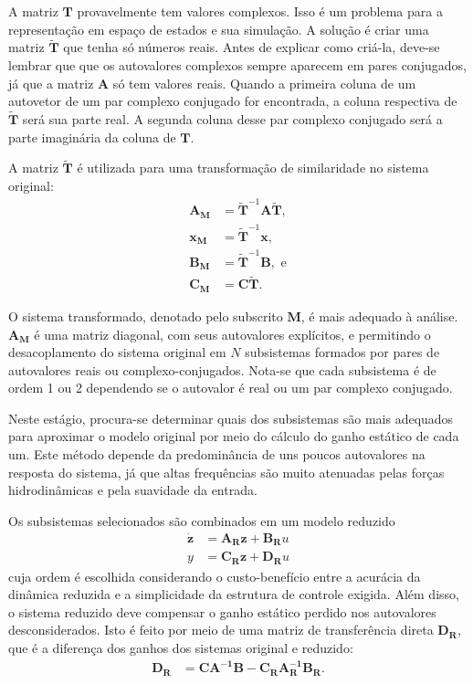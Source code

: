  A matriz $\mathbf{T}$ provavelmente tem valores complexos. Isso é um problema para a representação em espaço de estados e sua simulação. A solução é criar uma matriz $\mathbf{\tilde{T}}$ que tenha só números reais. Antes de explicar como criá-la, deve-se lembrar que que os autovalores complexos sempre aparecem em pares conjugados, já que a matriz $\mathbf{A}$ só tem valores reais. Quando a primeira coluna de um autovetor de um par complexo conjugado for encontrada, a coluna respectiva de $\mathbf{\tilde{T}}$ será sua parte real. A segunda coluna desse par complexo conjugado será a parte imaginária da coluna de $\mathbf{T}$.


 A matriz $\mathbf{\tilde{T}}$ é utilizada para uma transformação de similaridade no sistema original: \begin{align}
	\mathbf{A_M} &= \mathbf{\tilde{T}}^{-1}\mathbf{A}\mathbf{\tilde{T}},\\
	\mathbf{x_M} &=\mathbf{\tilde{T}}^{-1}\mathbf{x},	\\
	\mathbf{B_M} &= \mathbf{\tilde{T}}^{-1}\mathbf{B},\textrm{ e}\\
	\mathbf{C_M} &=\mathbf{C}\mathbf{\tilde{T}}.
\end{align}


 O sistema transformado, denotado pelo subscrito $\mathbf{M}$, é mais adequado à análise. $\mathbf{A_M}$ é uma matriz diagonal, com seus autovalores explícitos, e permitindo o desacoplamento do sistema original em $N$ subsistemas formados por pares de autovalores reais ou complexo-conjugados. Nota-se que cada subsistema é de ordem 1 ou 2 dependendo se o autovalor é real ou um par complexo conjugado.

 Neste estágio, procura-se determinar quais dos subsistemas são mais adequados para aproximar o modelo original por meio do cálculo do ganho estático de cada um. Este método depende da predominância de uns poucos autovalores na resposta do sistema, já que altas frequências são muito atenuadas pelas forças hidrodinâmicas e pela suavidade da entrada.

 Os subsistemas selecionados são combinados em um modelo reduzido \begin{align}
	\mathbf{\dot{z}} &= \mathbf{A_R}\mathbf{z}+\mathbf{B_R}u\\
	y &= \mathbf{C_R}\mathbf{z}+\mathbf{D_R}u
\end{align} cuja ordem é escolhida considerando o custo-benefício entre a acurácia da dinâmica reduzida e a simplicidade da estrutura de controle exigida. Além disso, o sistema reduzido deve compensar o ganho estático perdido nos autovalores desconsiderados. Isto é feito por meio de uma matriz de transferência direta $\mathbf{D_R}$, que é a diferença dos ganhos dos sistemas original e reduzido: \begin{align}
	\mathbf{D_R}&=\mathbf{C}\mathbf{A^{-1}}\mathbf{B}-\mathbf{C_R}\mathbf{A_R^{-1}}\mathbf{B_R}.
\end{align}


